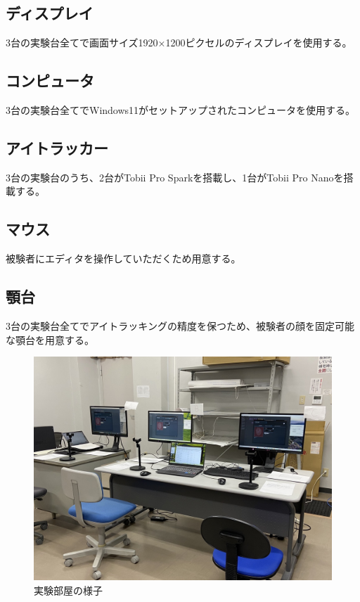 \documentclass[paper=a4paper,fontsize=11pt]{jlreq}
\begin{document}
    \subsection{ディスプレイ}
      3台の実験台全てで画面サイズ1920×1200ピクセルのディスプレイを使用する。

    \subsection{コンピュータ}
      3台の実験台全てでWindows11がセットアップされたコンピュータを使用する。

    \subsection{アイトラッカー}
      3台の実験台のうち、2台がTobii Pro Sparkを搭載し、1台がTobii Pro Nanoを搭載する。

    \subsection{マウス}
      被験者にエディタを操作していただくため用意する。

    \subsection{顎台}
      3台の実験台全てでアイトラッキングの精度を保つため、被験者の顔を固定可能な顎台を用意する。
      
    \begin{figure}[htbp]
      \centering
      \includegraphics[width=0.8\linewidth]{実験部屋.jpg}
      \caption{実験部屋の様子}
      \label{実験部屋}
    \end{figure}
    \FloatBarrier  
  \clearpage
\end{document}
